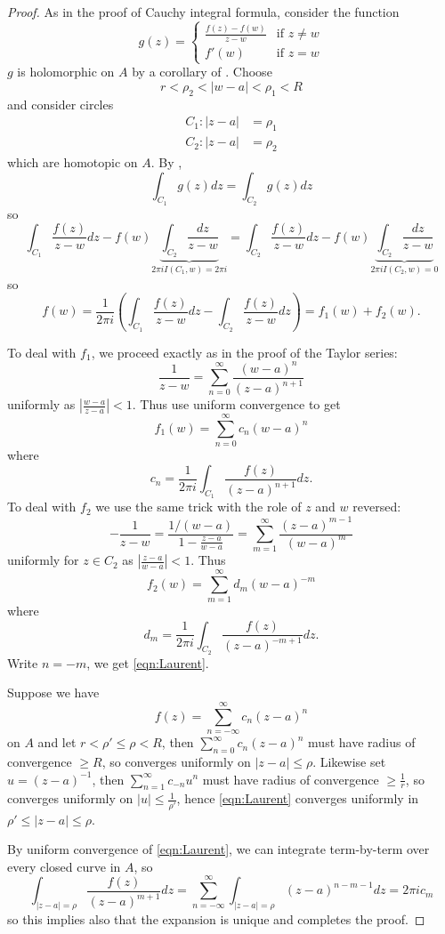 \documentclass[a4paper]{article}
\begin{document}
\begin{proof}
  As in the proof of Cauchy integral formula, consider the function
  \[
    g(z) =
    \begin{cases}
      \frac{f(z) - f(w)}{z - w} & \text{if } z \neq w \\
      f'(w) & \text{if } z = w
    \end{cases}
  \]
  \(g\) is holomorphic on \(A\) by a corollary of . Choose
  \[
    r < \rho_2 < |w - a| < \rho_1 < R
  \]
  and consider circles
  \begin{align*}
    C_1: |z - a| &= \rho_1 \\
    C_2: |z - a| &= \rho_2
  \end{align*}
  which are homotopic on \(A\). By ,
  \[
    \int_{C_1} g(z) dz = \int_{C_2} g(z) dz
  \]
  so
  \[
    \int_{C_1} \frac{f(z)}{z - w} dz - f(w) \underbrace{\int_{C_2} \frac{dz}{z - w}}_{2\pi i I(C_1, w) = 2\pi i}
    = \int_{C_2} \frac{f(z)}{z - w} dz - f(w) \underbrace{\int_{C_2} \frac{dz}{z - w}}_{2\pi i I(C_2, w) = 0}
  \]
  so
  \[
    f(w)
    = \frac{1}{2\pi i} \left( \int_{C_1} \frac{f(z)}{z - w} dz - \int_{C_2} \frac{f(z)}{z - w} dz \right)
    = f_1(w) + f_2(w).
  \]

  To deal with \(f_1\), we proceed exactly as in the proof of the Taylor series:
  \[
    \frac{1}{z - w}
    = \sum_{n = 0}^\infty \frac{(w - a)^n}{(z - a)^{n + 1}}
  \]
  uniformly as \(\left| \frac{w - a}{z - a} \right| < 1\). Thus use uniform convergence to get
  \[
    f_1(w) = \sum_{n = 0}^\infty c_n(w - a)^n
  \]
  where
  \[
    c_n = \frac{1}{2\pi i} \int_{C_1} \frac{f(z)}{(z - a)^{n + 1}} dz.
  \]
  To deal with \(f_2\) we use the same trick with the role of \(z\) and \(w\) reversed:
  \[
    -\frac{1}{z - w}
    = \frac{1/(w - a)}{1 - \frac{z - a}{w - a}}
    = \sum_{m = 1}^\infty \frac{(z - a)^{m - 1}}{(w - a)^m}
  \]
  uniformly for \(z \in C_2\) as \(\left| \frac{z - a}{w - a} \right| < 1\). Thus
  \[
    f_2(w) = \sum_{m = 1}^\infty d_m (w - a)^{-m}
  \]
  where
  \[
    d_m = \frac{1}{2\pi i} \int_{C_2} \frac{f(z)}{(z - a)^{-m + 1}} dz.
  \]
  Write \(n = -m\), we get \eqref{eqn:Laurent}.

  Suppose we have
  \[
    f(z) = \sum_{n = -\infty}^\infty c_n(z - a)^n
  \]
  on \(A\) and let \(r < \rho' \leq \rho < R\), then \(\sum_{n = 0}^\infty c_n(z - a)^n\) must have radius of convergence \(\geq R\), so converges uniformly on \(|z - a| \leq \rho\). Likewise set \(u = (z - a)^{-1}\), then \(\sum_{n = 1}^\infty c_{-n}u^n\) must have radius of convergence \(\geq \frac{1}{r}\), so converges uniformly on \(|u| \leq \frac{1}{\rho'}\), hence \eqref{eqn:Laurent} converges uniformly in \(\rho' \leq |z - a| \leq \rho\).

  By uniform convergence of \eqref{eqn:Laurent}, we can integrate term-by-term over every closed curve in \(A\), so
  \[
    \int_{|z - a| = \rho} \frac{f(z)}{(z - a)^{m + 1}} dz
    = \sum_{n = -\infty}^\infty \int_{|z - a| = \rho} (z - a)^{n - m - 1} dz
    = 2\pi i c_m
  \]
  so this implies also that the expansion is unique and completes the proof.
\end{proof}
\end{document}
